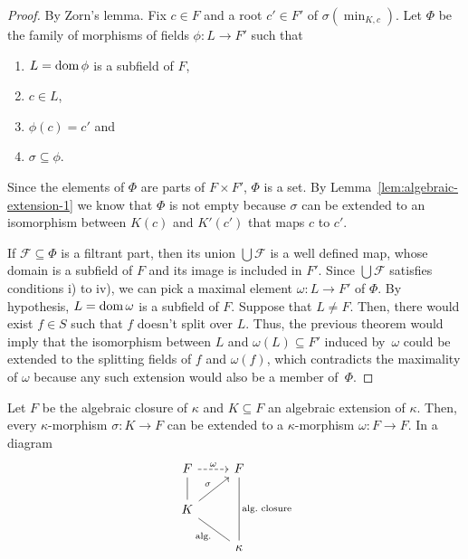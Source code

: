 \begin{proof}
    By Zorn's lemma. Fix $c\in F$ and a root $c'\in F'$ of $\sigma(\min_{K,c})$. Let $\Phi$ be the family of morphisms of fields $\phi\colon L\to F'$ such that
    \begin{enumerate}[\rm i)]
        \item $L=\operatorname{dom}\phi$ is a subfield of $F$,
        
        \item $c\in L$,
        
        \item $\phi(c)=c'$ and
        
        \item $\sigma\subseteq\phi$. 
    \end{enumerate}
    Since the elements of $\Phi$ are parts of $F\times F'$, $\Phi$ is a set. By Lemma~\ref{lem:algebraic-extension-1} we know that $\Phi$ is not empty because $\sigma$ can be extended to an isomorphism between $K(c)$ and $K'(c')$ that maps $c$ to $c'$.
    
    If $\mathcal F\subseteq\Phi$ is a filtrant part, then its union $\bigcup\mathcal F$ is a well defined map, whose domain is a subfield of $F$ and its image is included in $F'$. Since $\bigcup\mathcal F$ satisfies conditions i) to iv), we can pick a maximal element $\omega\colon L\to F'$ of $\Phi$. By hypothesis, $L=\operatorname{dom}\omega$ is a subfield of $F$. Suppose that $L\ne F$. Then, there would exist $f\in S$ such that $f$ doesn't split over $L$. Thus, the previous theorem would imply that the isomorphism between $L$ and $\omega(L)\subseteq F'$ induced by~$\omega$ could be extended to the splitting fields of $f$ and $\omega(f)$, which contradicts the maximality of $\omega$ because any such extension would also be a member of~$\Phi$.
    
\end{proof}

\begin{cor}\label{cor:interior-morphism-extension}
    Let\/ $F$ be the algebraic closure of\/ $\kappa$ and\/ $K\subseteq F$ an algebraic extension of\/ $\kappa$. Then, every\/ $\kappa$-morphism\/ $\sigma\colon K\to F$ can be extended to a\/ $\kappa$-morphism\/ $\omega\colon F\to F$. In a diagram
    $$
        \begin{tikzcd}
            F
                    \arrow[r,"\omega",dashed]
                &F\\
            K
                    \arrow[ru,"\sigma"]
                    \arrow[u,no head]\\
                &\kappa
                    \arrow[uu,"\text{alg.~closure}"',no head]
                    \arrow[lu,"\text{alg.}",no head]
        \end{tikzcd}
    $$
\end{cor}

